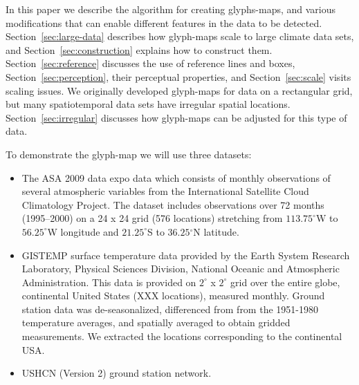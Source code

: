 \documentclass[oneside]{article}
\begin{document}


In this paper we describe the algorithm for creating glyphs-maps, and various modifications that can enable different features in the data to be detected. Section~\ref{sec:large-data} describes how glyph-maps scale to large climate data sets, and Section~\ref{sec:construction} explains how to construct them. Section~\ref{sec:reference} discusses the use of reference lines and boxes, Section~\ref{sec:perception}, their perceptual properties, and Section~\ref{sec:scale} visits scaling issues. We originally developed glyph-maps for data on a rectangular grid, but many spatiotemporal data sets have irregular spatial locations. Section~\ref{sec:irregular} discusses how glyph-maps can be adjusted for this type of data.

To demonstrate the glyph-map we will use three datasets:

\begin{itemize}

  \item The ASA 2009 data expo data which consists of monthly observations of
  several atmospheric variables from the International Satellite Cloud
  Climatology Project. The dataset includes observations over 72 months
  (1995--2000) on a 24 x 24 grid (576 locations) stretching from
  $113.75^{\circ}$W to $56.25^{\circ}$W longitude and $21.25^{\circ}$S to
  $36.25{^\circ}$N latitude.

  \item GISTEMP surface temperature data provided by the Earth System Research
  Laboratory, Physical Sciences Division, National Oceanic and Atmospheric
  Administration. This data is provided on $2^{\circ}$ x $2^{\circ}$ grid over
  the entire globe, continental United States (XXX locations), measured
  monthly. Ground station data was de-seasonalized, differenced from from the
  1951-1980 temperature averages, and spatially averaged to obtain gridded
  measurements. We extracted the locations corresponding to the continental
  USA.

  \item USHCN (Version 2) ground station network.
  
\end{itemize}
\end{document}
